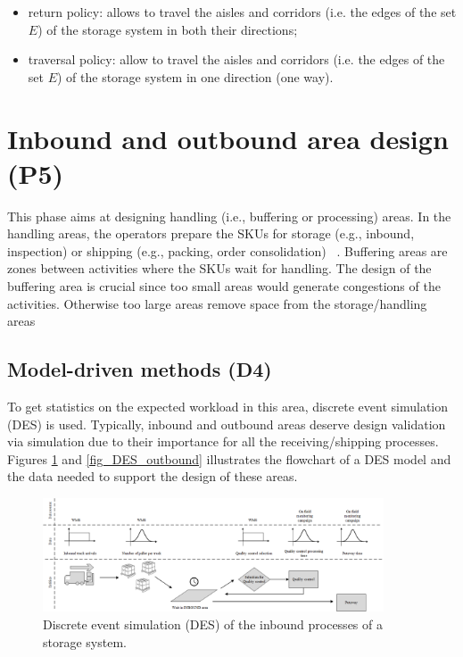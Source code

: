 \begin{itemize}
    \item return policy: allows to travel the aisles and corridors (i.e. the edges of the set $E$) of the storage system in both their directions;
    \item traversal policy: allow to travel the aisles and corridors (i.e. the edges of the set $E$)  of the storage system in one direction (one way).
\end{itemize}


\section{Inbound and outbound area design (P5)} \label{secWhAreaDesign}

This phase aims at designing handling (i.e., buffering or processing) areas. In the handling areas, the operators prepare the SKUs for storage (e.g., inbound, inspection) or shipping (e.g., packing, order consolidation) ~\cite{Bassan1980, Heragu2005b, Pandit1993}. Buffering areas are zones between activities where the SKUs wait for handling. The design of the buffering area is crucial since too small areas would generate congestions of the activities. Otherwise too large areas remove space from the storage/handling areas

\subsection{Model-driven methods (D4)}

To get statistics on the expected workload in this area, discrete event simulation (DES) is used. Typically, inbound and outbound areas deserve design validation via simulation due to their importance for all the receiving/shipping processes. Figures \ref{fig_DES_inboud} and \ref{fig_DES_outbound} illustrates the flowchart of a DES model and the data needed to support the design of these areas. 


\begin{figure}[hbt!]
\centering
\includegraphics[width=0.9\textwidth]{SectionWarehouses/design_figures/fig_DES_inboud.png}
\captionsetup{type=figure}
\caption{Discrete event simulation (DES) of the inbound processes of a storage system.}
\label{fig_DES_inboud}
\end{figure}


